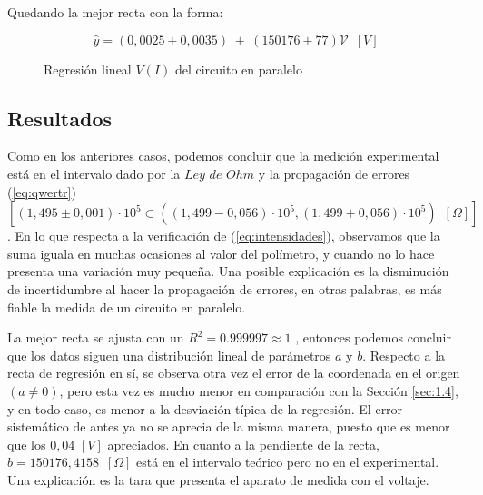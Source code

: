 \documentclass[11pt]{report}
\begin{document}
\begin{refsection}
Quedando la mejor recta con la forma:

\begin{equation}
    \hat{y}= (0,0025 \pm 0,0035) \hspace{3pt}+ \hspace{3pt}(150176 \pm 77)\mathscr{V}\hspace{6pt} [V]
\end{equation}

\begin{figure}[H]
    \begin{center}
        
    \end{center}
    \caption{Regresión lineal $V(I)$ del circuito en paralelo}
\end{figure}

\subsection{Resultados}

Como en los anteriores casos, podemos concluir que la medición experimental está en el intervalo dado por la $Ley$ $de$ $Ohm$ 
y la propagación de errores (\ref{eq:qwertr}) $[(1,495 \pm 0,001) \cdot 10^5 \subset ((1,499 - 0,056)\cdot 10^5,(1,499 + 0,056)\cdot 10^5)\hspace{6pt} [\Omega]]$.
En lo que respecta a la verificación de (\ref{eq:intensidades}), observamos que la suma iguala en muchas ocasiones al valor del polímetro,
y cuando no lo hace presenta una variación muy pequeña. Una posible explicación es la disminución de incertidumbre al hacer la propagación de errores,
en otras palabras, es más fiable la medida de un circuito en paralelo.

\medskip

La mejor recta se ajusta con un $R^2 = 0.999997 \approx 1$ , entonces podemos concluir que los datos siguen una distribución lineal de parámetros
$a$ y $b$.
Respecto a la recta de regresión en sí, se observa otra vez el error de la coordenada en el origen $(a\neq 0)$, pero esta vez es 
mucho menor en comparación con la Sección \ref{sec:1.4}, y en todo caso, es menor a la desviación típica de la regresión. 
El error sistemático de antes ya no se aprecia de la misma manera, puesto que es menor que los $0,04 \hspace{4pt}[V]$ apreciados.
En cuanto a la pendiente de la recta, $b=150176,4158\hspace{6pt}[\Omega]$ está en el intervalo teórico pero no en el experimental. Una
explicación es la tara que presenta el aparato de medida con el voltaje.


\end{refsection}
\end{document}
